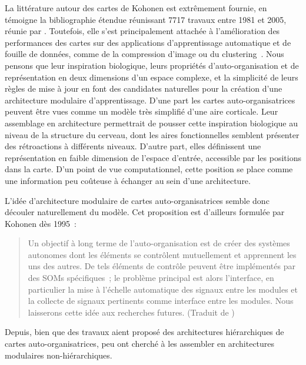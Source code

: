 La littérature autour des cartes de Kohonen est extrêmement fournie, en témoigne la bibliographie étendue réunissant 7717 travaux entre 1981 et 2005, réunie par \cite{Kaski1998BibliographyOS,oja_bibliography_2002,Honkela2009BIBLIOGRAPHYOS}.
Toutefois, elle s'est principalement attachée à l'amélioration des performances des cartes sur des applications d'apprentissage automatique et de fouille de données, comme de la compression d'image ou du clustering~\parencite{kohonen_essentials_2013}.
Nous pensons que leur inspiration biologique, leurs propriétés d'auto-organisation et de représentation en deux dimensions d'un espace complexe, et la simplicité de leurs règles de mise à jour en font des candidates naturelles pour la création d'une architecture modulaire d'apprentissage.
D'une part les cartes auto-organisatrices peuvent être vues comme un modèle très simplifié d'une aire corticale. Leur assemblage en architecture permettrait de pousser cette inspiration biologique au niveau de la structure du cerveau, dont les aires fonctionnelles semblent présenter des rétroactions à différents niveaux.
D'autre part, elles définissent une représentation en faible dimension de l'espace d'entrée, accessible par les positions dans la carte. D'un point de vue computationnel, cette position se place comme une information peu coûteuse à échanger au sein d'une architecture.

L'idée d'architecture modulaire de cartes auto-organisatrices semble donc découler naturellement du modèle. Cet proposition est d'ailleurs formulée par Kohonen dès 1995~:
\begin{quote}
\og Un objectif à long terme de l'auto-organisation est de créer des systèmes autonomes dont les éléments se contrôlent mutuellement et apprennent les uns des autres. De tels éléments de contrôle peuvent être implémentés par des SOMs spécifiques~; le problème principal est alors l'interface, en particulier la mise à l'échelle automatique des signaux entre les modules et la collecte de signaux pertinents comme interface entre les modules. Nous laisserons cette idée aux recherches futures. \fg{}
(Traduit de \cite{Kohonen1995SelfOrganizingM})
\end{quote}

Depuis, bien que des travaux aient proposé des architectures hiérarchiques de cartes auto-organisatrices, peu ont cherché à les assembler en architectures modulaires non-hiérarchiques.

